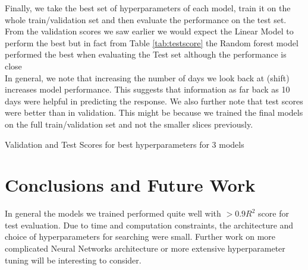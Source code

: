 \documentclass{article}
\begin{document}
Finally, we take the best set of hyperparameters of each model, train it on the whole train/validation set and then evaluate the performance on the test set. From the validation scores we saw earlier we would expect the Linear Model to perform the best but in fact from Table \ref{tab:testscore} the Random forest model performed the best when evaluating the Test set although the performance is close\\

In general, we note that increasing the number of days we look back at (shift) increases model performance. This suggests that information as far back as 10 days were helpful in predicting the response. We also further note that test scores were better than in validation. This might be because we trained the final models on the full train/validation set and not the smaller slices previously.

\begin{table}
\caption{\label{tab:testscore}Validation and Test Scores for best hyperparameters for 3 models}
\end{table}

\section{Conclusions and Future Work}

In general the models we trained performed quite well with $>0.9 R^2$ score for test evaluation. Due to time and computation constraints, the architecture and choice of hyperparameters for searching were small. Further work on more complicated Neural Networks architecture or more extensive hyperparameter tuning will be interesting to consider. 

\clearpage
\end{document}
